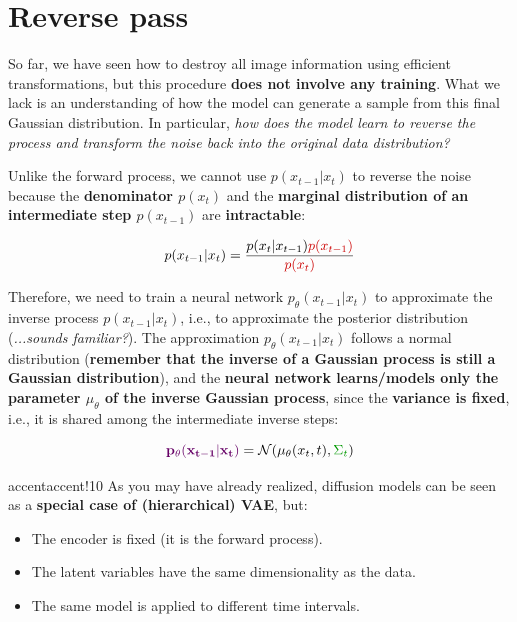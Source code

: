 \section{Reverse pass}


So far, we have seen how to destroy all image information using efficient transformations, but this procedure \textbf{does not involve any training}. What we lack is an understanding of how the model can generate a sample from this final Gaussian distribution. In particular, \textit{how does the model learn to reverse the process and transform the noise back into the original data distribution?}

Unlike the forward process, we cannot use $p(x_{t-1}|x_t)$ to reverse the noise because the \textbf{\textcolor{myred}{denominator $p(x_t)$}} and the \textbf{\textcolor{myred}{marginal distribution of an intermediate step $p(x_{t-1})$}} are \textbf{\textcolor{myred}{intractable}}:

$$p(x_{t-1}|x_t) = \frac{p(x_t|x_{t-1})\textcolor{myred}{p(x_{t-1})}}{\textcolor{myred}{p(x_t)}}$$

Therefore, we need to train a neural network $p_{\theta}(x_{t-1}|x_{t})$  to approximate the inverse process $p(x_{t-1}|x_t)$,  i.e., to approximate the posterior distribution (\textit{...sounds familiar?}). The approximation $p_{\theta}(x_{t-1}|x_t)$ follows a normal distribution (\textbf{remember that the inverse of a Gaussian process is still a Gaussian distribution}), and the \textbf{neural network learns/models only the parameter $\mu_{\theta}$ of the inverse Gaussian process}, since the \textbf{\textcolor{mygreen}{variance is fixed}}, i.e., it is shared among the intermediate inverse steps:

$$\mathbf{\textcolor{mypurple}{p_{\theta}(x_{t-1}|x_t)}} = \mathcal{N}(\mu_{\theta}(x_t, t), \textcolor{mygreen}{\Sigma_t})$$

\begin{remark}{accent}{accent!10}
As you may have already realized, diffusion models can be seen as a \textbf{special case of (hierarchical) VAE}, but:
\begin{itemize}
    \item The encoder is fixed (it is the forward process).
    \item The latent variables have the same dimensionality as the data.
    \item The same model is applied to different time intervals.
\end{itemize}
\end{remark}

